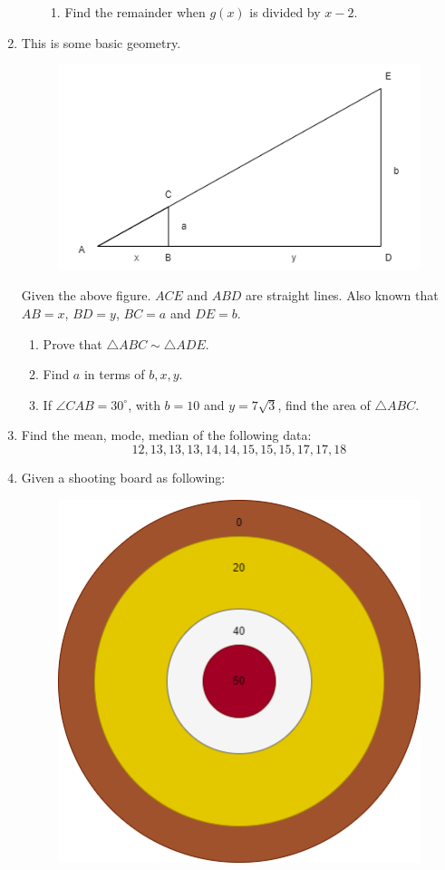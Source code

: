 \documentclass[11pt]{article}
\begin{document}
\begin{enumerate}
\begin{enumerate}
\begin{enumerate}
                \item Find the remainder when $g(x)$ is divided by $x-2$.
            \end{enumerate}
        \end{enumerate}
        \item This is some basic geometry.\begin{figure}[H]
            \centering
            \includegraphics[scale=0.6]{similar_triangle.png}
        \end{figure}Given the above figure. $ACE$ and $ABD$ are straight lines. Also known that $AB=x$, $BD=y$, $BC=a$ and $DE=b$.\begin{enumerate}
            \item Prove that $\triangle ABC\sim\triangle ADE$.
            \item Find $a$ in terms of $b,x,y$.
            \item If $\angle CAB = 30^\circ$, with $b=10$ and $y=7\sqrt{3}$, find the area of $\triangle ABC$.
        \end{enumerate}
        \item Find the mean, mode, median of the following data: $$12,13,13,13,14,14,15,15,15,17,17,18$$
        \item Given a shooting board as following:\begin{figure}[H]
            \centering
            \includegraphics[scale=0.6]{shooting_board.png}

\end{figure}
\end{enumerate}
\end{document}
